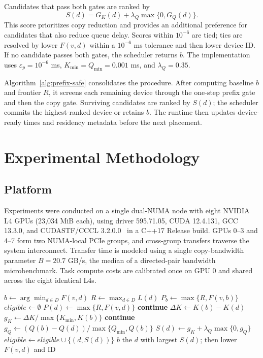 \documentclass[sigconf]{acmart}
\begin{document}
Candidates that pass both gates are ranked by
\[
S(d)=G_K(d)+\lambda_Q\max\{0,G_Q(d)\}.
\]
This score prioritizes copy reduction and provides an additional preference for candidates that also reduce queue delay. Scores within \(10^{-6}\) are tied; ties are resolved by lower \(F(v,d)\) within a \(10^{-6}\) ms tolerance and then lower device ID. If no candidate passes both gates, the scheduler returns \(b\). The implementation uses \(\varepsilon_p=10^{-6}\) ms, \(K_{\min}=Q_{\min}=0.001\) ms, and \(\lambda_Q=0.35\).

Algorithm~\ref{alg:prefix-safe} consolidates the procedure. After computing baseline \(b\) and frontier \(R\), it screens each remaining device through the one-step prefix gate and then the copy gate. Surviving candidates are ranked by \(S(d)\); the scheduler commits the highest-ranked device or retains \(b\). The runtime then updates device-ready times and residency metadata before the next placement.

\section{Experimental Methodology}\label{sec:methodology}

\subsection{Platform}\label{sec:platform}

Experiments were conducted on a single dual-NUMA node with eight NVIDIA L4 GPUs (23,034 MiB each), using driver 595.71.05, CUDA 12.4.131, GCC 13.3.0, and CUDASTF/CCCL 3.2.0.0~\citep{nvidia2026cccl320} in a C++17 Release build. GPUs 0--3 and 4--7 form two NUMA-local PCIe groups, and cross-group transfers traverse the system interconnect. Transfer time is modeled using a single copy-bandwidth parameter \(B=20.7\) GB/s, the median of a directed-pair bandwidth microbenchmark. Task compute costs are calibrated once on GPU 0 and shared across the eight identical L4s.

\begin{algorithm}[t]
\caption{Prefix-safe copy-aware placement.}
\label{alg:prefix-safe}
\begin{algorithmic}[1]
\State $b\gets\arg\min_{d\in D}F(v,d)$
\State $R\gets\max_{d\in D}L(d)$
\State $P_b\gets\max\{R,F(v,b)\}$
\State $\mathit{eligible}\gets\emptyset$
  \State $P(d)\gets\max\{R,F(v,d)\}$
    \State \textbf{continue} 
  \EndIf
  \State $\Delta K\gets K(b)-K(d)$
  \State $g_K\gets\Delta K/\max\{K_{\min},K(b)\}$
    \State \textbf{continue} 
  \EndIf
  \State $g_Q\gets(Q(b)-Q(d))/\max\{Q_{\min},Q(b)\}$
  \State $S(d)\gets g_K+\lambda_Q\max\{0,g_Q\}$
  \State $\mathit{eligible}\gets\mathit{eligible}\cup\{(d,S(d))\}$
\EndFor
{}
  \State \Return $b$
\EndIf
\State \Return the $d$ with largest $S(d)$; then lower $F(v,d)$ and ID
\EndProcedure
\end{algorithmic}
\end{algorithm}
\end{document}
